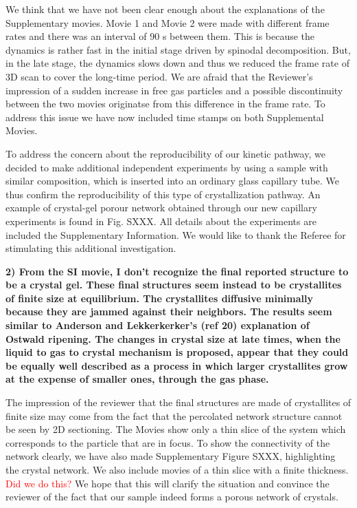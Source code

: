 \documentclass[11pt]{article}
\begin{document}
\bigskip
\doublespacing


We think that we have not been clear enough about the explanations of the Supplementary movies. Movie 1 and Movie 2 were made with different frame rates and there was an interval of 90 s between them. This is because the dynamics is rather fast in the initial stage driven by spinodal decomposition. But, in the late stage, the dynamics slows down and thus we reduced the frame rate of 3D scan to cover the long-time period. We are afraid that the Reviewer’s impression of a sudden increase in free gas particles and a possible discontinuity between the two movies originatse from this difference in the frame rate.
To address this issue we have now included time stamps on both Supplemental Movies.

To address the concern about the reproducibility of our kinetic pathway, we decided to make additional independent experiments
by using a sample with similar composition, which is inserted into an ordinary glass capillary tube. We thus confirm the reproducibility of this type of crystallization pathway. An example of crystal-gel porour network obtained through our new capillary experiments
is found in Fig. SXXX. All details about the experiments are included the Supplementary Information. We would like to thank the Referee for stimulating
this additional investigation.


\vspace{1em}

\singlespacing

{\bf
2) From the SI movie, I don't recognize the final reported structure to be a crystal gel. These final structures seem instead to be crystallites of finite size at equilibrium. The crystallites diffusive minimally because they are jammed against their neighbors. The results seem similar to Anderson and Lekkerkerker's (ref 20) explanation of Ostwald ripening. The changes in crystal size at late times, when the liquid to gas to crystal mechanism is proposed, appear that they could be equally well described as a process in which larger crystallites grow at the expense of smaller ones, through the gas phase.

}



\bigskip
\doublespacing

The impression of the reviewer that the final structures are made of crystallites of finite size may come from the fact that the percolated network structure cannot be seen by 2D sectioning. The Movies show only a thin slice of the system which corresponds to the particle that are in focus.
To show the connectivity of the network clearly, we have also made Supplementary Figure SXXX, highlighting the crystal network.
We also include movies of a thin slice with a finite thickness. \textcolor{red}{Did we do this?} 
We hope that this will clarify the situation and convince the reviewer of the fact that our sample indeed forms a porous network of crystals. 
\end{document}
